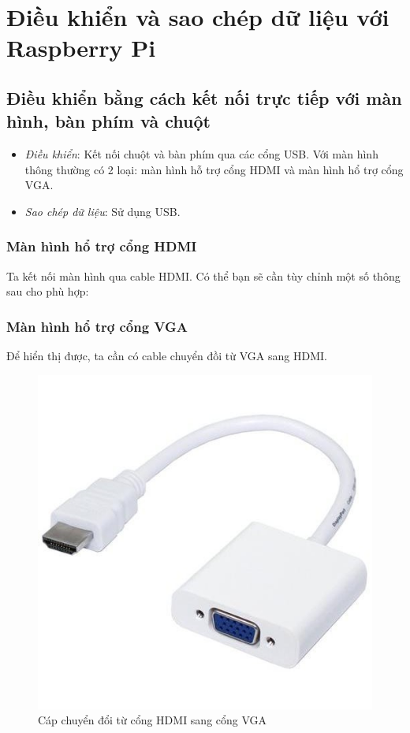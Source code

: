 \chapter{Điều khiển và sao chép dữ liệu với Raspberry Pi}
\section{Điều khiển bằng cách kết nối trực tiếp với màn hình, bàn phím và chuột}
\begin{itemize}
\item \textit{Điều khiển}: Kết nối chuột và bàn phím qua các cổng USB. Với màn hình thông thường có 2 loại: màn hình hỗ trợ cổng HDMI và màn hình hổ trợ cổng VGA.
\item \textit{Sao chép dữ liệu}: Sử dụng USB.
\end{itemize}
\subsection{Màn hình hổ trợ cổng HDMI}
Ta kết nối màn hình qua cable HDMI. Có thể bạn sẽ cần tùy chỉnh một số thông sau cho phù hợp:
\subsection{Màn hình hổ trợ cổng VGA}
Để hiển thị được, ta cần có cable chuyển đồi từ VGA sang HDMI.
\begin{figure}[!h]
\begin{center}
\includegraphics[scale=.3]{remote/images/HDMI-VGA-white}
\end{center}
\caption{Cáp chuyển đổi từ cổng HDMI sang cổng VGA}
\end{figure}
